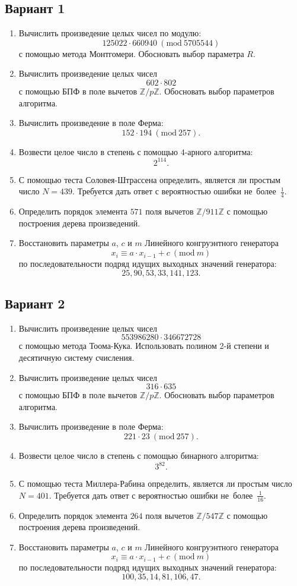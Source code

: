 \documentclass[14pt]{extarticle}
\begin{document}
	\subsection{Вариант 1}
	\begin{enumerate}
		\item Вычислить произведение целых чисел по модулю: \[125022 \cdot 660940\ (\textrm{mod}\ 5705544)\] с помощью метода Монтгомери. Обосновать выбор параметра $R$.
		\item Вычислить произведение целых чисел \[602 \cdot 802\] с помощью БПФ в поле вычетов $\mathbb{Z}/p\mathbb{Z}$. Обосновать выбор параметров алгоритма.
		\item Вычислить произведение в поле Ферма: \[152 \cdot 194\ (\textrm{mod}\ 257).\]
		\item Возвести целое число в степень с помощью $4$-арного алгоритма: \[2^{114}.\]
		\item С помощью теста Соловея-Штрассена определить, является ли простым число $N = 439$. Требуется дать ответ с вероятностью ошибки не~более~$\frac14$.
		\item Определить порядок элемента $571$ поля вычетов $\mathbb{Z}/911\mathbb{Z}$ с помощью построения дерева произведений.
		\item Восстановить параметры $a$, $c$ и $m$ Линейного конгруэнтного генератора \[x_i \equiv a \cdot x_{i-1} + c\ (\textrm{mod}\ m)\] по последовательности подряд идущих выходных значений генератора: \[25, 90, 53, 33, 141, 123.\]
	\end{enumerate}
\clearpage	\subsection{Вариант 2}
	\begin{enumerate}
		\item Вычислить произведение целых чисел \[553986280 \cdot 346672728\] с помощью метода Тоома-Кука. Использовать полином 2-й степени и десятичную систему счисления.
		\item Вычислить произведение целых чисел \[316 \cdot 635\] с помощью БПФ в поле вычетов $\mathbb{Z}/p\mathbb{Z}$. Обосновать выбор параметров алгоритма.
		\item Вычислить произведение в поле Ферма: \[221 \cdot 23\ (\textrm{mod}\ 257).\]
		\item Возвести целое число в степень с помощью бинарного алгоритма: \[3^{82}.\]
		\item С помощью теста Миллера-Рабина определить, является ли простым число $N = 401$. Требуется дать ответ с вероятностью ошибки не~более~$\frac{1}{16}$.
		\item Определить порядок элемента $264$ поля вычетов $\mathbb{Z}/547\mathbb{Z}$ с помощью построения дерева произведений.
		\item Восстановить параметры $a$, $c$ и $m$ Линейного конгруэнтного генератора \[x_i \equiv a \cdot x_{i-1} + c\ (\textrm{mod}\ m)\] по последовательности подряд идущих выходных значений генератора: \[100, 35, 14, 81, 106, 47.\]
	\end{enumerate}
\end{document}
